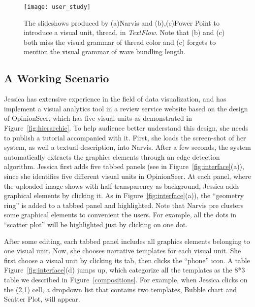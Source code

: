  
 \begin{figure*}
 \centering %
 \texttt{[image: user\_study]}
 \caption{The slideshows produced by (a)Narvis and (b),(c)Power Point to introduce a visual unit, thread, in \textit{TextFlow}\cite{cui_textflow:_2011}. Note that (b) and (c) both miss the visual grammar of thread color and (c) forgets to mention the visual grammar of wave bundling length. }
 \label{fig:user_study}
\end{figure*}
 
\subsection{A Working Scenario}
Jessica has extensive experience in the field of data visualization, and has implement a visual analytics tool in a review service website based on the design of OpinionSeer\cite{wu_opinionseer:_2010}, which has five visual units as demonstrated in Figure~\ref{fig:hierarchic}. To help audience better understand this design, she needs to publish a tutorial accompanied with it.
First, she loads the screen-shot of her system, as well a textual description, into Narvis.
After a few seconds, the system automatically extracts the graphics elements through an edge detection algorithm. Jessica first adds five tabbed panels (see in Figure~\ref{fig:interface}(a)), since she identifies five different visual units in OpinionSeer. At each panel, where the uploaded image shows with half-transparency as background, Jessica adds graphical elements by clicking it. As in Figure~\ref{fig:interface}(a)), the ``geometry ring'' is added to a tabbed panel and highlighted. Note that Narvis pre clusters some graphical elements to convenient the users. For example, all the dots in ``scatter plot'' will be highlighted just by clicking on one dot. 

After some editing, each tabbed panel includes all graphics elements belonging to one visual unit. Now, she chooses narrative templates for each visual unit. 
She first choose a visual unit by clicking its tab, then clicks the ``phone'' icon. A table Figure~\ref{fig:interface}(d) jumps up, which categorize all the templates as the 8*3 table we described in Figure~\ref{compositions}. For example, when Jessica clicks on the (2,1) cell, a dropdown list that contains two templates, Bubble chart and Scatter Plot, will appear.  

